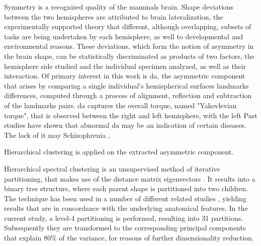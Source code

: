 \documentclass[master=ebin]{kulemt}
\begin{document}
Symmetry is a recognized quality of the mammals brain. Shape deviations between the two hemispheres are attributed to brain lateralization, the experimentally supported theory that different, although overlapping, subsets of tasks are being undertaken by each hemisphere, as well to developmental and environmental reasons. These deviations, which form the notion of asymmetry in the brain shape, can be statistically discriminated as products of two factors, the hemisphere side studied and the individual specimen analyzed, as well as their interaction\cite{klingenberg2002}. Of primary interest in this work is \ac{da}, the asymmetric component that arises by comparing a single individual's hemispherical surfaces landmarks differences, computed through a process of alignment, reflection and subtraction of the landmarks pairs. \ac{da} captures the overall torque, named "Yakovlevian torque", that is observed between the right and left hemisphere, with the left  Past studies have shown that abnormal \ac{da} may be an indication of certain diseases. The lack of it may Schizophrenia \cite{Ribolsi2014},  






 Hierarchical clustering is applied on the extracted asymmetric component.

Hierarchical spectral clustering is an unsupervised method of iterative partitioning, that makes use of the distance matrix eigenvectors \cite{Ng2002}. It results into a binary tree structure, where each parent shape is partitioned into two children. The technique has been used in a number of different related studies \cite{Claes2018}\cite{Naqvi2021}, yielding results that are in concordance with the underlying anatomical features. In the current study, a level-4 partitioning is performed, resulting into 31 partitions. Subsequently they are transformed to the corresponding principal components that explain 80\% of the variance, for reasons of further dimensionality reduction.



\backmatter


\end{document}

